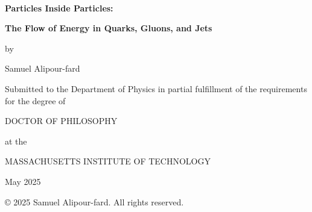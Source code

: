 \begin{center}
    ~
    \vspace{50pt}

    {\LARGE \textbf{Particles Inside Particles:} }

    \vspace{10pt}

    {\LARGE \textbf{The Flow of Energy in Quarks, Gluons, and Jets} }

    \Large

    \vspace{30pt}

    by

    \vspace{25pt}

    Samuel Alipour-fard

    \vspace{40pt}
    \vspace{40pt}

    Submitted to the Department of Physics in partial fulfillment of the requirements for the degree of

    \vspace{20pt}

    DOCTOR OF PHILOSOPHY

    \vspace{15pt}

    at the

    \vspace{15pt}

    MASSACHUSETTS INSTITUTE OF TECHNOLOGY

    \vspace{20pt}

    May 2025


    \vspace{40pt}
    \vspace{40pt}

    \copyright{} 2025 Samuel Alipour-fard. All rights reserved.

\end{center}
